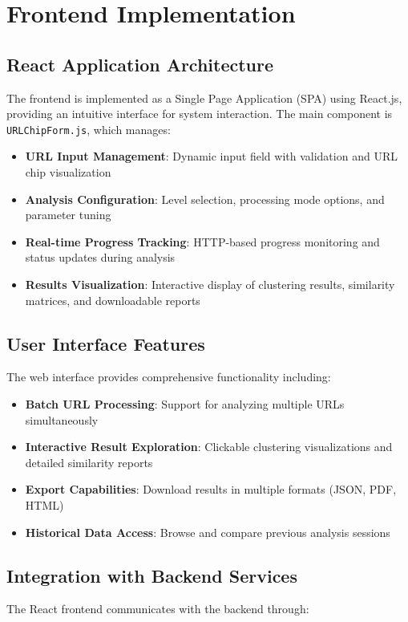 \section{Frontend Implementation}
\label{sec:frontend-implementation}

\subsection{React Application Architecture}
The frontend is implemented as a Single Page Application (SPA) using React.js, providing an intuitive interface for system interaction. The main component is \texttt{URLChipForm.js}, which manages:

\begin{itemize}
    \item \textbf{URL Input Management}: Dynamic input field with validation and URL chip visualization
    \item \textbf{Analysis Configuration}: Level selection, processing mode options, and parameter tuning
    \item \textbf{Real-time Progress Tracking}: HTTP-based progress monitoring and status updates during analysis
    \item \textbf{Results Visualization}: Interactive display of clustering results, similarity matrices, and downloadable reports
\end{itemize}

\subsection{User Interface Features}
The web interface provides comprehensive functionality including:

\begin{itemize}
    \item \textbf{Batch URL Processing}: Support for analyzing multiple URLs simultaneously
    \item \textbf{Interactive Result Exploration}: Clickable clustering visualizations and detailed similarity reports
    \item \textbf{Export Capabilities}: Download results in multiple formats (JSON, PDF, HTML)
    \item \textbf{Historical Data Access}: Browse and compare previous analysis sessions
\end{itemize}

\subsection{Integration with Backend Services}
The React frontend communicates with the backend through:

